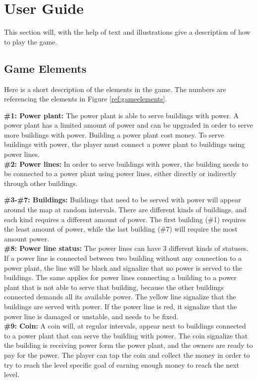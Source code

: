 \chapter{User Guide}

This section will, with the help of text and illustrations give a description of how to play the game. 

\clearpage

\section*{Game Elements}
	Here is a short description of the elements in the game. The numbers are referencing the elements in
	Figure \ref{ref:gameelements}.

	{\bf \#1: Power plant:} The power plant is able to serve buildings with power.
	A power plant has a limited amount of power and can be upgraded
	in order to serve more buildings with power. Building a power plant cost money.
	To serve buildings with power, the player must connect a power plant to
	buildings using power lines. \\
	
	{\bf \#2: Power lines: } In order to serve buildings with power, the building needs 
	to be connected to a power plant using power lines, either directly or indirectly 
	through other buildings.

	
	{\bf \#3-\#7: Buildings: } Buildings that need to be served with power will appear 
	around the map at random intervals. There are different kinds of buildings, and each 
	kind requires a different amount of power. The first building (\#1) requires the least 
	amount of power, while the last building (\#7) will require the most amount power. \\
	
	{\bf \#8: Power line status:} The power lines can have 3 different kinds of statuses.
	If a power line is connected between two building without any connection
	to a power plant, the line will be black and signalize that no power is served
	to the buildings. The same applies for power lines connecting a building to a power 
	plant that is not able to serve that building, because the other buildings connected 
	demands all its available power. The yellow line signalize that the buildings are served 
	with power. If the power line is red, it signalize that the power 
	line is damaged or unstable, and needs to be fixed. \\ 
	
	{\bf \#9: Coin:} A coin will, at regular intervals, appear next to buildings connected to
	a power plant that can serve the building with power. The coin signalize that the building 
	is receiving power form the power plant, and the owners are ready to pay for the power. The player
	can tap the coin and collect the money in order to try to reach the level specific goal of earning 
	enough money to reach the next level.

